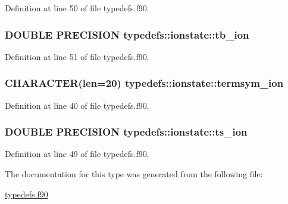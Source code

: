 Definition at line 50 of file typedefs.f90.\hypertarget{typetypedefs_1_1ionstate_a66ce379f0c85ec75599550df878e176f}{
\subsubsection[{tb\_\-ion}]{\setlength{\rightskip}{0pt plus 5cm}DOUBLE PRECISION {\bf typedefs::ionstate::tb\_\-ion}}}
\label{typetypedefs_1_1ionstate_a66ce379f0c85ec75599550df878e176f}


Definition at line 51 of file typedefs.f90.\hypertarget{typetypedefs_1_1ionstate_ac11d69f74d71d66d31101e69e2042532}{
\subsubsection[{termsym\_\-ion}]{\setlength{\rightskip}{0pt plus 5cm}CHARACTER(len=20) {\bf typedefs::ionstate::termsym\_\-ion}}}
\label{typetypedefs_1_1ionstate_ac11d69f74d71d66d31101e69e2042532}


Definition at line 40 of file typedefs.f90.\hypertarget{typetypedefs_1_1ionstate_adab9ef692d0747a3eb4a4ef3b14cea9f}{
\subsubsection[{ts\_\-ion}]{\setlength{\rightskip}{0pt plus 5cm}DOUBLE PRECISION {\bf typedefs::ionstate::ts\_\-ion}}}
\label{typetypedefs_1_1ionstate_adab9ef692d0747a3eb4a4ef3b14cea9f}


Definition at line 49 of file typedefs.f90.

The documentation for this type was generated from the following file:\begin{DoxyCompactItemize}
\item 
\hyperlink{typedefs_8f90}{typedefs.f90}\end{DoxyCompactItemize}
